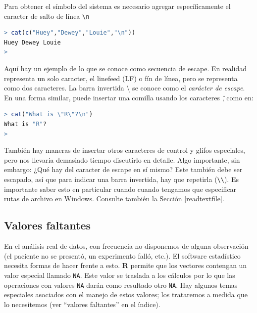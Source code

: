 Para obtener el símbolo del sistema es necesario agregar específicamente el
caracter de salto de línea \texttt{\textbackslash{}n}

\begin{lstlisting}[language=R]
> cat(c("Huey","Dewey","Louie","\n"))
Huey Dewey Louie
>
\end{lstlisting}

Aquí hay un ejemplo de lo que se conoce como secuencia de escape. En realidad
representa un solo caracter, el linefeed (LF) o fín de línea, pero se
representa como dos caracteres. La barra invertida \textbackslash{} se conoce
como el \textit{carácter de escape}. En una forma similar, puede insertar una
comilla usando los caracteres \texttt{\"}, como en:

\begin{lstlisting}[language=R]
> cat("What is \"R\"?\n")
What is "R"?
>
\end{lstlisting}

También hay maneras de insertar otros caracteres de control y glifos
especiales, pero nos llevaría demasiado tiempo discutirlo en detalle. Algo
importante, sin embargo: ¿Qué hay del caracter de escape en sí mismo?  Este
también debe ser escapado, así que para indicar una barra invertida, hay que
repetirla (\texttt{\textbackslash{}\textbackslash{}}). Es importante saber esto
en particular cuando cuando tengamos que especificar rutas de archivo en
Windows. Consulte también la Sección \ref{readtextfile}.

\subsection{Valores faltantes} \label{na}

En el análisis real de datos, con frecuencia no disponemos de alguna
observación (el paciente no se presentó, un experimento falló, etc.). El
software estadístico necesita formas de hacer frente a esto. \textbf{R} permite
que los vectores contengan un valor especial llamado \texttt{NA}. Este valor se
traslada a los cálculos por lo que las operaciones con valores \texttt{NA}
darán como resultado otro \texttt{NA}. Hay algunos temas especiales asociados
con el manejo de estos valores; los trataremos a medida que lo necesitemos (ver
``valores faltantes'' en el índice).


